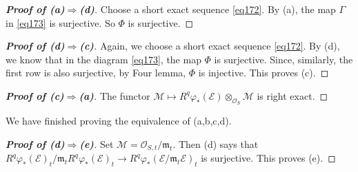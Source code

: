 \documentclass[12pt,b5paper,notitlepage]{report}
\theoremstyle{definition}
\theoremstyle{plain}
\newcommand{\mc}{\mathcal}
\newcommand{\scr}{\mathscr}
\newcommand{\mk}{\mathfrak m}
\numberwithin{equation}{section}
\begin{document}
\begin{proof}[\textbf{Proof of (a)$\Rightarrow$(d)}]
Choose a short exact sequence \eqref{eq172}. By (a), the map $\Gamma$ in \eqref{eq173} is surjective. So $\Phi$ is surjective.
\end{proof}




\begin{proof}[\textbf{Proof of (d)$\Rightarrow$(c)}]
Again, we choose a short exact sequence \eqref{eq172}. By (d), we know that in the diagram \eqref{eq173}, the map $\Phi$ is surjective. Since, similarly, the first row is also surjective, by Four lemma, $\Phi$ is injective. This proves (c).
\end{proof}

\begin{proof}[\textbf{Proof of (c)$\Rightarrow$(a)}]
The functor $\mc M\mapsto R^q\varphi_*(\scr E)\otimes_{\scr O_S}\mc M$ is right exact.
\end{proof}


We have finished proving the equivalence of (a,b,c,d).

\begin{proof}[\textbf{Proof of (d)$\Rightarrow$(e)}]
Set $\mc M=\scr O_{S,t}/\mk_t$. Then (d) says that $R^q\varphi_*(\scr E)_t/\mk_tR^q\varphi_*(\scr E)_t\rightarrow R^q\varphi_*(\scr E/\mk_t\scr E)_t$ is surjective. This proves (e).
\end{proof}
\end{document}
